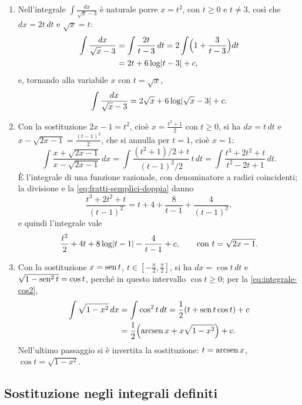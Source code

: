 \begin{esempio}\label{es:sostituzioni}
\begin{enumerate}[label=\textup{(\alph*)}]
  \item Nell'integrale $\int\frac{dx}{\sqrt x-3}$ è naturale porre $x=t^{2}$, con $t\ge0$
  e $t\neq3$, così che $dx=2t\,dt$ e $\sqrt x=t$:
  \[
  \begin{aligned}
    \int\frac{dx}{\sqrt x-3}&=\int\frac{2t}{t-3}\,dt=2\int\Bigl(1+\frac3{t-3}\Bigr)dt\\
    &=2t+6\log\lvert t-3\rvert+c ,
  \end{aligned}
  \]
  e, tornando alla variabile $x$ con $t=\sqrt x$,
  \[
    \int\frac{dx}{\sqrt x-3}=2\sqrt x+6\log\lvert \sqrt x-3\rvert+c .
  \]
  \item Con la sostituzione $2x-1=t^{2}$, cioè $x=\frac{t^{2}+1}2$ con $t\ge0$, si ha $dx=t\,dt$ e
  $x-\sqrt{2x-1}=\frac{(t-1)^{2}}2$, che si annulla per $t=1$, cioè $x=1$:
  \[
    \int\frac{x+\sqrt{2x-1}}{x-\sqrt{2x-1}}\,dx=\int\frac{(t^{2}+1)/2+t}{(t-1)^{2}/2}\,t\,dt
    =\int\frac{t^{3}+2t^{2}+t}{t^{2}-2t+1}\,dt .
  \]
  È l'integrale di una funzione razionale, con denominatore a radici coincidenti; la
  divisione e la \eqref{eq:fratti-semplici-doppia} danno
  \[
    \frac{t^{3}+2t^{2}+t}{(t-1)^{2}}=t+4+\frac8{t-1}+\frac4{(t-1)^{2}} ,
  \]
  e quindi l'integrale vale
  \[
    \frac{t^{2}}2+4t+8\log\lvert t-1\rvert-\frac4{t-1}+c, \qquad\text{con } t=\sqrt{2x-1} .
  \]
  \item Con la sostituzione $x=\operatorname{sen} t$, $t\in[-\frac\pi2,\frac\pi2]$, si ha $dx=\cos t\,dt$ e
  $\sqrt{1-\operatorname{sen}^{2}t}=\cos t$, perché in questo intervallo $\cos t\ge0$; per la
  \eqref{eq:integrale-cos2},
  \begin{equation}\label{eq:integrale-semicerchio}
  \begin{split}
    \int\sqrt{1-x^{2}}\,dx&=\int\cos^{2}t\,dt=\frac12(t+\operatorname{sen} t\cos t)+c\\
    &=\frac12\Bigl(\operatorname{arcsen} x+x\sqrt{1-x^{2}}\Bigr)+c .
  \end{split}
  \end{equation}
  Nell'ultimo passaggio si è invertita la sostituzione: $t=\operatorname{arcsen} x$, $\cos t=\sqrt{1-x^{2}}$.
\end{enumerate}
\end{esempio}

\subsection{Sostituzione negli integrali definiti}


